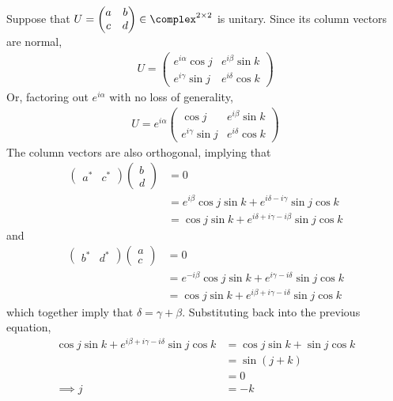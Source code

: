 \begingroup
\newcommand{\expo}[1]{\exp \left( #1 \right)}
%
Suppose that $U = \begin{pmatrix} a & b \\ c & d \end{pmatrix} \in \complex^{2 \times 2}$ is unitary.
%
Since its column vectors are normal,
%
\begin{align}
U = \begin{pmatrix} e^{i\alpha} \cos j & e^{i\beta} \sin k \\ e^{i\gamma} \sin j & e^{i\delta} \cos k \end{pmatrix}
\end{align}
%
Or, factoring out $e^{i\alpha}$ with no loss of generality,
\begin{align}
U = e^{i\alpha} \begin{pmatrix} \cos j & e^{i\beta} \sin k \\ e^{i\gamma} \sin j & e^{i\delta} \cos k \end{pmatrix}
\end{align}
%
The column vectors are also orthogonal, implying that
%
\begin{align}
\begin{pmatrix} a^* & c^* \end{pmatrix} \begin{pmatrix} b \\ d \end{pmatrix} &= 0 \\
&= e^{i\beta} \cos j \sin k + e^{i\delta-i\gamma} \sin j \cos k \\
&= \cos j \sin k + e^{i\delta+i\gamma-i\beta} \sin j \cos k
\end{align}
%
and
%
\begin{align}
\begin{pmatrix} b^* & d^* \end{pmatrix} \begin{pmatrix} a \\ c \end{pmatrix} &= 0 \\
&= e^{-i\beta} \cos j \sin k + e^{i\gamma-i\delta} \sin j \cos k \\
&= \cos j \sin k + e^{i\beta+i\gamma-i\delta} \sin j \cos k
\end{align}
%
which together imply that $\delta = \gamma + \beta$.
%
Substituting back into the previous equation,
%
\begin{align}
\cos j \sin k + e^{i\beta+i\gamma-i\delta} \sin j \cos k &= \cos j \sin k + \sin j \cos k \\
&= \sin \left( j + k \right) \\
&= 0 \\
\implies j &= -k
\end{align}
